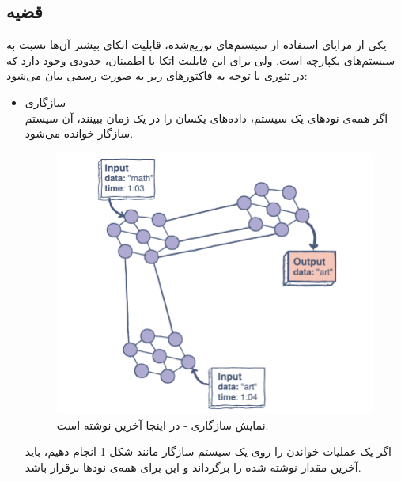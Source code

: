 \documentclass{article}
\begin{document}
\begin{multicols}{2}
\section{قضیه }
یکی از مزایای استفاده از سیستم‌های توزیع‌شده، قابلیت اتکای بیشتر آن‌ها نسبت به سیستم‌های یکپارچه است.
ولی برای این قابلیت اتکا یا اطمینان، حدودی وجود دارد که در تئوری 
با توجه به فاکتورهای زیر به صورت رسمی بیان می‌شود:
\begin{itemize}
    \item سازگاری
     \\
    اگر همه‌ی نودهای یک سیستم، داده‌های یکسان را در یک زمان ببینند، آن سیستم سازگار خوانده می‌شود. 
    \begin{figure}[H]
        \center
        \includegraphics[width=0.8\linewidth]{Photos/HW1/Consistency.png}
        \caption{نمایش سازگاری -
        در اینجا  آخرین نوشته است.}
        \label{fig:my_label}
    \end{figure}
    اگر یک عملیات خواندن را روی یک سیستم سازگار مانند شکل 1 انجام دهیم، باید آخرین مقدار نوشته شده را برگرداند و این برای همه‌ی نودها برقرار باشد.
    


\end{itemize}
\end{multicols}
\end{document}
